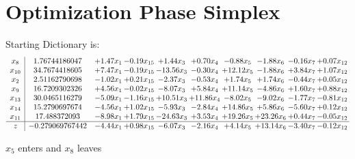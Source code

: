 \documentclass[9pt]{article}
\begin{document}
\section{Optimization Phase Simplex}
Starting Dictionary is:
\[\begin{array}{c| c c@{\hskip 2pt} c@{\hskip 2pt} c@{\hskip 2pt} c@{\hskip 2pt} c@{\hskip 2pt} c@{\hskip 2pt} c@{\hskip 2pt} c@{\hskip 2pt} }
 x_{8}   &  1.76744186047 & +  1.47 x_{1} & -0.19 x_{15} & +  1.44 x_{3} & +  0.70 x_{4} & -0.88 x_{5} & -1.88 x_{6} & -0.16 x_{7} & +  0.07 x_{12}\\
 x_{10}   &  34.7674418605 & +  7.47 x_{1} & -0.19 x_{15} & -13.56 x_{3} & -0.30 x_{4} & + 12.12 x_{5} & -1.88 x_{6} & +  3.84 x_{7} & +  1.07 x_{12}\\
 x_{2}   &  2.51162790698 & -1.02 x_{1} & +  0.21 x_{15} & -2.37 x_{3} & -0.53 x_{4} & +  1.74 x_{5} & +  1.74 x_{6} & -0.44 x_{7} & +  0.05 x_{12}\\
 x_{9}   &  16.7209302326 & +  4.56 x_{1} & -0.02 x_{15} & -8.07 x_{3} & +  5.84 x_{4} & + 11.14 x_{5} & -4.86 x_{6} & +  1.60 x_{7} & +  0.88 x_{12}\\
 x_{13}   &  30.0465116279 & -5.09 x_{1} & -1.16 x_{15} & + 10.51 x_{3} & + 11.86 x_{4} & -8.02 x_{5} & -9.02 x_{6} & -1.77 x_{7} & -0.81 x_{12}\\
 x_{14}   &  15.2790697674 & -4.56 x_{1} & +  1.02 x_{15} & -5.93 x_{3} & -2.84 x_{4} & + 14.86 x_{5} & +  5.86 x_{6} & -5.60 x_{7} & +  0.12 x_{12}\\
 x_{11}   &  17.488372093 & -8.98 x_{1} & +  1.79 x_{15} & -24.63 x_{3} & +  3.53 x_{4} & + 19.26 x_{5} & + 23.26 x_{6} & +  0.44 x_{7} & -0.05 x_{12}\\
\hline
z    &  -0.279069767442 & -4.44 x_{1} & +  0.98 x_{15} & -6.07 x_{3} & -2.16 x_{4} & +  4.14 x_{5} & + 13.14 x_{6} & -3.40 x_{7} & -0.12 x_{12}\\
\end{array}\]


 $ x_{5} $ enters and $ x_{8} $ leaves 
\end{document}

